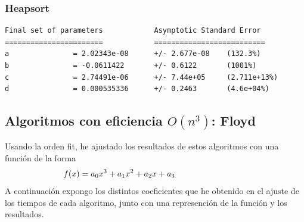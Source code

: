 \documentclass[a4]{article}
\begin{document}
\begin{figure}[H]
  \centering
\end{figure}

\subsubsection{Heapsort}

\begin{verbatim}
Final set of parameters            Asymptotic Standard Error
=======================            ==========================
a               = 2.02343e-08      +/- 2.677e-08    (132.3%)
b               = -0.0611422       +/- 0.6122       (1001%)
c               = 2.74491e-06      +/- 7.44e+05     (2.711e+13%)
d               = 0.000535336      +/- 0.2463       (4.6e+04%)
\end{verbatim}

\begin{figure}[H]
  \centering
\end{figure}

\subsection{Algoritmos con eficiencia $O(n^3)$: Floyd}

Usando la orden fit, he ajustado los resultados de estos algoritmos
con una función de la
forma \[\hspace{-30mm}f(x)=a_0x^3+a_1x^2+a_2x+a_3\] A continuación
expongo los distintos coeficientes que he obtenido en el ajuste de los
tiempos de cada algoritmo, junto con una represención de la función y
los resultados.
\end{document}
